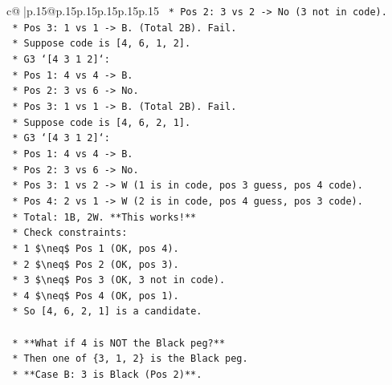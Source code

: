 \documentclass{article}
\begin{document}
{\begin{supertabular}{c@{$\;$}|p{.15\linewidth}@{}p{.15\linewidth}p{.15\linewidth}p{.15\linewidth}p{.15\linewidth}p{.15\linewidth}}
{{{\texttt{                        *   Pos 2: 3 vs 2 {-}> No (3 not in code).} \\
\texttt{                        *   Pos 3: 1 vs 1 {-}> B. (Total 2B). Fail.} \\
\texttt{                *   Suppose code is {[}4, 6, 1, 2{]}.} \\
\texttt{                    *   G3 `{[}4 3 1 2{]}`:} \\
\texttt{                        *   Pos 1: 4 vs 4 {-}> B.} \\
\texttt{                        *   Pos 2: 3 vs 6 {-}> No.} \\
\texttt{                        *   Pos 3: 1 vs 1 {-}> B. (Total 2B). Fail.} \\
\texttt{                *   Suppose code is {[}4, 6, 2, 1{]}.} \\
\texttt{                    *   G3 `{[}4 3 1 2{]}`:} \\
\texttt{                        *   Pos 1: 4 vs 4 {-}> B.} \\
\texttt{                        *   Pos 2: 3 vs 6 {-}> No.} \\
\texttt{                        *   Pos 3: 1 vs 2 {-}> W (1 is in code, pos 3 guess, pos 4 code).} \\
\texttt{                        *   Pos 4: 2 vs 1 {-}> W (2 is in code, pos 4 guess, pos 3 code).} \\
\texttt{                        *   Total: 1B, 2W. **This works!**} \\
\texttt{                    *   Check constraints:} \\
\texttt{                        *   1 \$\textbackslash{}neq\$ Pos 1 (OK, pos 4).} \\
\texttt{                        *   2 \$\textbackslash{}neq\$ Pos 2 (OK, pos 3).} \\
\texttt{                        *   3 \$\textbackslash{}neq\$ Pos 3 (OK, 3 not in code).} \\
\texttt{                        *   4 \$\textbackslash{}neq\$ Pos 4 (OK, pos 1).} \\
\texttt{                    *   So {[}4, 6, 2, 1{]} is a candidate.} \\
\\ 
\texttt{        *   **What if 4 is NOT the Black peg?**} \\
\texttt{            *   Then one of \{3, 1, 2\} is the Black peg.} \\
\texttt{            *   **Case B: 3 is Black (Pos 2)**.} \\
}}}
\end{supertabular}}
\end{document}
